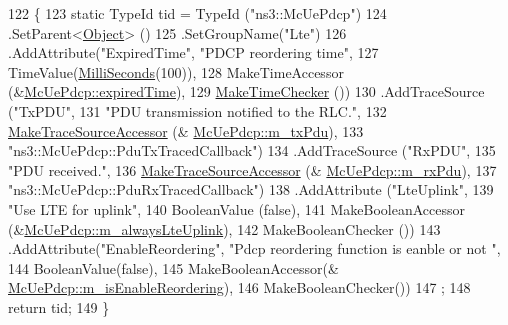 \begin{DoxyCode}
122 \{
123   \textcolor{keyword}{static} TypeId tid = TypeId (\textcolor{stringliteral}{"ns3::McUePdcp"})
124     .SetParent<\hyperlink{classns3_1_1Object_a40860402e64d8008fb42329df7097cdb}{Object}> ()
125     .SetGroupName(\textcolor{stringliteral}{"Lte"})
126         .AddAttribute(\textcolor{stringliteral}{"ExpiredTime"}, \textcolor{stringliteral}{"PDCP reordering time"},
127                          TimeValue(\hyperlink{group__timecivil_gaf26127cf4571146b83a92ee18679c7a9}{MilliSeconds}(100)),
128                          MakeTimeAccessor (&\hyperlink{classns3_1_1McUePdcp_a35e4829c509b15878ddf114faee30a7a}{McUePdcp::expiredTime}),
129              \hyperlink{group__time_ga7032965bd4afa578691d88c09e4481c1}{MakeTimeChecker} ())
130     .AddTraceSource (\textcolor{stringliteral}{"TxPDU"},
131                      \textcolor{stringliteral}{"PDU transmission notified to the RLC."},
132                      \hyperlink{group__tracing_gab21a770b9855af4e8f69f7531ea4a6b0}{MakeTraceSourceAccessor} (&
      \hyperlink{classns3_1_1McUePdcp_abe2ab1ab1b1e577e104aeb580b810558}{McUePdcp::m\_txPdu}),
133                      \textcolor{stringliteral}{"ns3::McUePdcp::PduTxTracedCallback"})
134     .AddTraceSource (\textcolor{stringliteral}{"RxPDU"},
135                      \textcolor{stringliteral}{"PDU received."},
136                      \hyperlink{group__tracing_gab21a770b9855af4e8f69f7531ea4a6b0}{MakeTraceSourceAccessor} (&
      \hyperlink{classns3_1_1McUePdcp_abc1e053fc92c4e96633a914c8ef5ed53}{McUePdcp::m\_rxPdu}),
137                      \textcolor{stringliteral}{"ns3::McUePdcp::PduRxTracedCallback"})
138     .AddAttribute (\textcolor{stringliteral}{"LteUplink"},
139                     \textcolor{stringliteral}{"Use LTE for uplink"},
140                     BooleanValue (\textcolor{keyword}{false}),
141                     MakeBooleanAccessor (&\hyperlink{classns3_1_1McUePdcp_add1fd75af318fec889e06a47f4407be7}{McUePdcp::m\_alwaysLteUplink}),
142                     MakeBooleanChecker ())
143         .AddAttribute(\textcolor{stringliteral}{"EnableReordering"}, \textcolor{stringliteral}{"Pdcp reordering function is eanble or not "},
144                                         BooleanValue(\textcolor{keyword}{false}),
145                                         MakeBooleanAccessor(&
      \hyperlink{classns3_1_1McUePdcp_aefa3008f536096e0d54de71d6596eb90}{McUePdcp::m\_isEnableReordering}),
146                                         MakeBooleanChecker())
147     ;
148   \textcolor{keywordflow}{return} tid;
149 \}
\end{DoxyCode}


